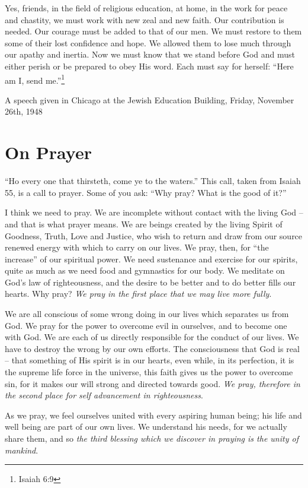 \documentclass[14pt, article, extrafontsizes, twopage, a4paper]{memoir}
\newcommand{\attr}[1]{
  {\raggedleft\smaller#1

  }
}
\begin{document}
Yes, friends, in the field of religious education, at
home, in the work for peace and chastity, we must work with
new zeal and new faith. Our contribution is needed. Our
courage must be added to that of our men. We must restore
to them some of their lost confidence and hope. We allowed
them to lose much through our apathy and inertia. Now we
must know that we stand before God and must either perish
or be prepared to obey His word. Each must say for
herself: ``Here am I, send me.''\footnote{Isaiah 6:9}

\attr{A speech given in Chicago at the Jewish Education Building, Friday, November 26th, 1948}

\chapter{On Prayer}

``Ho every one that thirsteth, come ye to the waters.''
This call, taken from Isaiah 55, is a call to prayer. Some
of you ask: ``Why pray? What is the good of it?''

I think we need to pray. We are incomplete without
contact with the living God -- and that is what prayer
means. We are beings created by the living Spirit of
Goodness, Truth, Love and Justice, who wish to return and
draw from our source renewed energy with which to carry on
our lives. We pray, then, for “the increase'' of our
spiritual power. We need sustenance and exercise for our
spirits, quite as much as we need food and gymnastics for
our body. We meditate on God's law of righteousness, and
the desire to be better and to do better fills our hearts.
Why pray? \textsl{We pray in the first place that we may live more
fully}.

We are all conscious of some wrong doing in our lives
which separates us from God. We pray for the power to
overcome evil in ourselves, and to become one with God. We
are each of us directly responsible for the conduct of our
lives. We have to destroy the wrong by our own efforts.
The consciousness that God is real -- that something of His
spirit is in our hearts, even while, in its perfection, it
is the supreme life force in the universe, this faith gives
us the power to overcome sin, for it makes our will strong
and directed towards good. \textsl{We pray, therefore in the
second place for self advancement in righteousness}.

As we pray, we feel ourselves united with every
aspiring human being; his life and well being are part of
our own lives. We understand his needs, for we actually
share them, and so \textsl{the third blessing which we discover in
  praying is the unity of mankind}.
\end{document}
